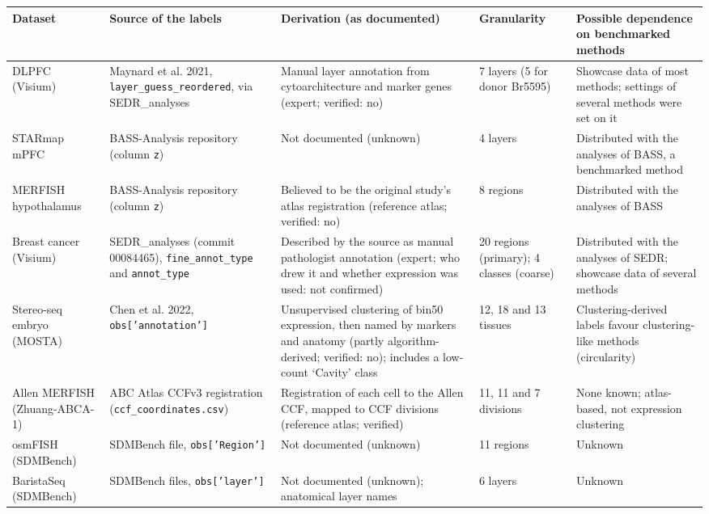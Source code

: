 \begin{tabular}{p{2.3cm}p{4.2cm}p{4.6cm}p{2.6cm}p{4.4cm}}\toprule
Dataset & Source of the labels & Derivation (as documented) & Granularity & Possible dependence on benchmarked methods \\\midrule
DLPFC (Visium) & Maynard et al. 2021, \texttt{layer\_guess\_reordered}, via SEDR\_analyses & Manual layer annotation from cytoarchitecture and marker genes (expert; verified: no) & 7 layers (5 for donor Br5595) & Showcase data of most methods; settings of several methods were set on it \\
STARmap mPFC & BASS-Analysis repository (column \texttt{z}) & Not documented (unknown) & 4 layers & Distributed with the analyses of BASS, a benchmarked method \\
MERFISH hypothalamus & BASS-Analysis repository (column \texttt{z}) & Believed to be the original study's atlas registration (reference atlas; verified: no) & 8 regions & Distributed with the analyses of BASS \\
Breast cancer (Visium) & SEDR\_analyses (commit 00084465), \texttt{fine\_annot\_type} and \texttt{annot\_type} & Described by the source as manual pathologist annotation (expert; who drew it and whether expression was used: not confirmed) & 20 regions (primary); 4 classes (coarse) & Distributed with the analyses of SEDR; showcase data of several methods \\
Stereo-seq embryo (MOSTA) & Chen et al. 2022, \texttt{obs['annotation']} & Unsupervised clustering of bin50 expression, then named by markers and anatomy (partly algorithm-derived; verified: no); includes a low-count `Cavity' class & 12, 18 and 13 tissues & Clustering-derived labels favour clustering-like methods (circularity) \\
Allen MERFISH (Zhuang-ABCA-1) & ABC Atlas CCFv3 registration (\texttt{ccf\_coordinates.csv}) & Registration of each cell to the Allen CCF, mapped to CCF divisions (reference atlas; verified) & 11, 11 and 7 divisions & None known; atlas-based, not expression clustering \\
osmFISH (SDMBench) & SDMBench file, \texttt{obs['Region']} & Not documented (unknown) & 11 regions & Unknown \\
BaristaSeq (SDMBench) & SDMBench files, \texttt{obs['layer']} & Not documented (unknown); anatomical layer names & 6 layers & Unknown \\
\bottomrule\end{tabular}
